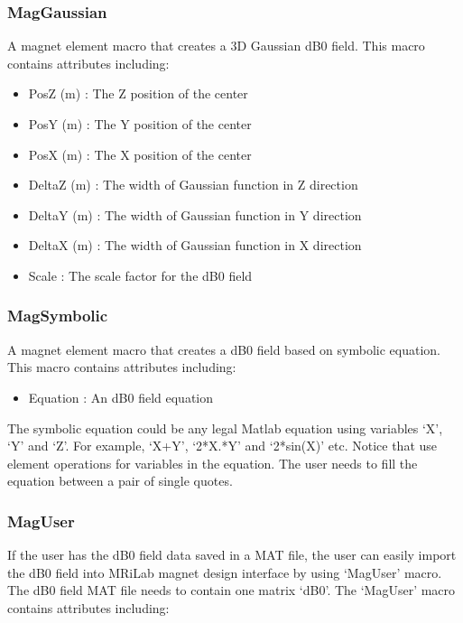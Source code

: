 \documentclass{book}%
\begin{document}
\subsubsection{MagGaussian}

A magnet element macro that creates a 3D Gaussian dB0 field. This macro contains attributes including:

\begin{itemize}
	\item PosZ (m) : The Z position of the center
  \item PosY (m) : The Y position of the center
	\item PosX (m) : The X position of the center
	\item DeltaZ (m) : The width of Gaussian function in Z direction
  \item DeltaY (m) : The width of Gaussian function in Y direction
	\item DeltaX (m) : The width of Gaussian function in X direction
	\item Scale : The scale factor for the dB0 field
\end{itemize}


\subsubsection{MagSymbolic}

A magnet element macro that creates a dB0 field based on symbolic equation. This macro contains attributes including:

\begin{itemize}
	\item Equation : An dB0 field equation
\end{itemize}

The symbolic equation could be any legal Matlab equation using variables `X', `Y' and `Z'. For example, `X+Y', `2*X.*Y' and `2*sin(X)' etc. Notice that use element operations for variables in the equation. The user needs to fill the equation between a pair of single quotes.

\subsubsection{MagUser}

If the user has the dB0 field data saved in a MAT file, the user can easily import the dB0 field into MRiLab magnet design interface by using `MagUser' macro. The dB0 field MAT file needs to contain one matrix `dB0'. The `MagUser' macro contains attributes including:
\end{document}
